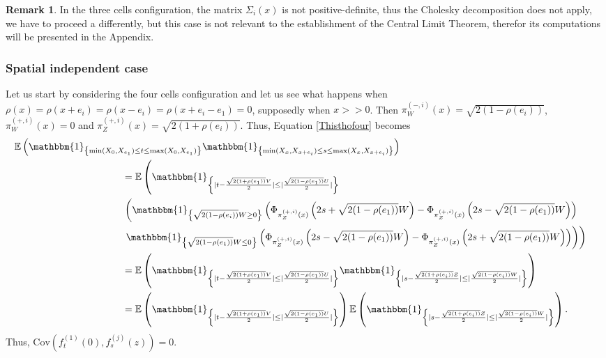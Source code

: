 \documentclass[12pt]{article}
\theoremstyle{Theorem}
\theoremstyle{definition}
\newtheorem{remark}{Remark}
\begin{document}
\begin{remark} In the three cells configuration, the matrix $\Sigma_{i}(x)$ is not positive-definite, thus the Cholesky decomposition does not apply, we have to proceed a differently, but this case is not relevant to the establishment of the Central Limit Theorem, therefor its computations will be presented in the Appendix.  
\end{remark}
\subsubsection{Spatial independent case} 
Let us start by considering the four cells configuration and let us see what happens when ${\rho(x) = \rho(x+e_i) = \rho(x-e_i) = \rho(x + e_i - e_1) = 0}$, supposedly when $x > > 0$. Then
$\pi^{\scriptscriptstyle(-, i)}_{W}(x) = \sqrt{2(1-\rho(e_i))}$, $\pi^{\scriptscriptstyle(+, i)}_{W}(x) = 0$ and $\pi^{\scriptscriptstyle(+, i)}_{Z}(x) = \sqrt{2(1+\rho(e_i))}.$ Thus, Equation \eqref{Thisthofour} becomes 
{\small
\begin{align*}
\mathbb{E}\left(\mathbbm{1}_{\left\{\min(X_{\scriptscriptstyle 0}, X_{e_1}) \leq t \leq \max(X_{\scriptscriptstyle 0}, X_{e_1})\right\}}\mathbbm{1}_{\left\{\min(X_{\scriptscriptstyle x}, X_{x+e_i}) \leq s \leq \max(X_{\scriptscriptstyle x}, X_{x+e_i}) \right\}}\right) \nonumber \\
& \hspace{-10cm} = \mathbb{E}\left(\mathbbm{1}_{\left\{ |t - \frac{\sqrt{2(1+\rho(e_1))}V}{2}| \leq |\frac{\sqrt{2(1-\rho(e_1))}U}{2}|\right\}} \right.  \\
& \left. \hspace{-10cm} \left(\mathbbm{1}_{\left\{\sqrt{2(1-\rho(e_i))}W \geq 0\right\}} \left(\Phi_{\pi^{\scriptscriptstyle(+, i)}_{Z}(x)}\left( 2s + \sqrt{2(1-\rho(e_1))} W\right) - \Phi_{\pi^{\scriptscriptstyle(+, i)}_{Z}(x)}\left(2s - \sqrt{2(1-\rho(e_1))} W\right)\right) \right. \right. \\
&  \hspace{-10cm} \left. \left. \mathbbm{1}_{\left\{\sqrt{2(1-\rho(e_1))} W  \leq 0\right\}} \left(\Phi_{\pi^{\scriptscriptstyle(+, i)}_{Z}(x)}\left( 2s - \sqrt{2(1-\rho(e_1))}W \right) - \Phi_{\pi^{\scriptscriptstyle(+, i)}_{Z}(x)}\left(2s + \sqrt{2(1-\rho(e_1))} W\right)\right)\right)\right)\\ 
& \hspace{-10cm} = \mathbb{E}\left(\mathbbm{1}_{\left\{ |t - \frac{\sqrt{2(1+\rho(e_1))}V}{2}| \leq |\frac{\sqrt{2(1-\rho(e_1))}U}{2}|\right\}}\mathbbm{1}_{\left\{ |s - \frac{\sqrt{2(1+\rho(e_i))}Z}{2}| \leq |\frac{\sqrt{2(1-\rho(e_i))}W}{2}|\right\}}\right) \\
& \hspace{-10cm} = \mathbb{E}\left(\mathbbm{1}_{\left\{ |t - \frac{\sqrt{2(1+\rho(e_1))}V}{2}| \leq |\frac{\sqrt{2(1-\rho(e_1))}U}{2}|\right\}}\right)\mathbb{E}\left(\mathbbm{1}_{\left\{ |s - \frac{\sqrt{2(1+\rho(e_i))}Z}{2}| \leq |\frac{\sqrt{2(1-\rho(e_i))}W}{2}|\right\}}\right).
\end{align*}
}Thus, $\text{Cov}\left(f_{t}^{\scriptscriptstyle (1)}(0), f_{s}^{ \scriptscriptstyle (j)}(z)\right) = 0.$
\end{document}
